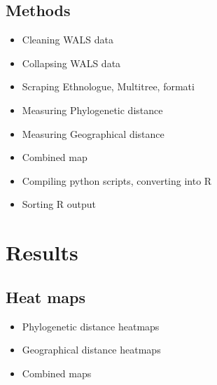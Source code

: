 \documentclass[11pt]{article}
\begin{document}
\subsection{Methods}
\begin{itemize}
\item Cleaning WALS data
\item Collapsing WALS data
\item Scraping Ethnologue, Multitree, formati
\item Measuring Phylogenetic distance
\item Measuring Geographical distance
\item Combined map

%

\item Compiling python scripts, converting into R
\item Sorting R output
\end{itemize}

\section{Results} %
\subsection{Heat maps}
\begin{itemize}
\item Phylogenetic distance heatmaps
\item Geographical distance heatmaps
\item Combined maps
\end{itemize}
\end{document}
